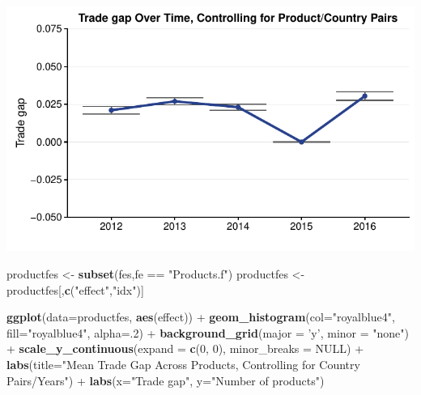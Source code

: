 \documentclass[10pt,]{article}
\newenvironment{Shaded}{\begin{snugshade}}{\end{snugshade}}
\newcommand{\KeywordTok}[1]{\textcolor[rgb]{0.13,0.29,0.53}{\textbf{{#1}}}}
\newcommand{\DataTypeTok}[1]{\textcolor[rgb]{0.13,0.29,0.53}{{#1}}}
\newcommand{\DecValTok}[1]{\textcolor[rgb]{0.00,0.00,0.81}{{#1}}}
\newcommand{\StringTok}[1]{\textcolor[rgb]{0.31,0.60,0.02}{{#1}}}
\newcommand{\OtherTok}[1]{\textcolor[rgb]{0.56,0.35,0.01}{{#1}}}
\newcommand{\NormalTok}[1]{{#1}}
\begin{document}
\begin{center}\includegraphics{Figs/value_years_reg-1} \end{center}

\begin{Shaded}
\begin{Highlighting}[]
\NormalTok{productfes <-}\StringTok{ }\KeywordTok{subset}\NormalTok{(fes,fe ==}\StringTok{ "Products.f"}\NormalTok{)}
\NormalTok{productfes <-}\StringTok{ }\NormalTok{productfes[,}\KeywordTok{c}\NormalTok{(}\StringTok{"effect"}\NormalTok{,}\StringTok{"idx"}\NormalTok{)]}

\KeywordTok{ggplot}\NormalTok{(}\DataTypeTok{data=}\NormalTok{productfes, }\KeywordTok{aes}\NormalTok{(effect)) +}
\StringTok{  }\KeywordTok{geom_histogram}\NormalTok{(}\DataTypeTok{col=}\StringTok{"royalblue4"}\NormalTok{,}
                 \DataTypeTok{fill=}\StringTok{"royalblue4"}\NormalTok{,}
                 \DataTypeTok{alpha=}\NormalTok{.}\DecValTok{2}\NormalTok{) +}
\StringTok{  }\KeywordTok{background_grid}\NormalTok{(}\DataTypeTok{major =} \StringTok{'y'}\NormalTok{, }\DataTypeTok{minor =} \StringTok{"none"}\NormalTok{) +}
\StringTok{  }\KeywordTok{scale_y_continuous}\NormalTok{(}\DataTypeTok{expand =} \KeywordTok{c}\NormalTok{(}\DecValTok{0}\NormalTok{, }\DecValTok{0}\NormalTok{), }\DataTypeTok{minor_breaks =} \OtherTok{NULL}\NormalTok{) +}
\StringTok{  }\KeywordTok{labs}\NormalTok{(}\DataTypeTok{title=}\StringTok{"Mean Trade Gap Across Products, Controlling for Country Pairs/Years"}\NormalTok{) +}
\StringTok{  }\KeywordTok{labs}\NormalTok{(}\DataTypeTok{x=}\StringTok{"Trade gap"}\NormalTok{, }\DataTypeTok{y=}\StringTok{"Number of products"}\NormalTok{)}
\end{Highlighting}
\end{Shaded}
\end{document}
